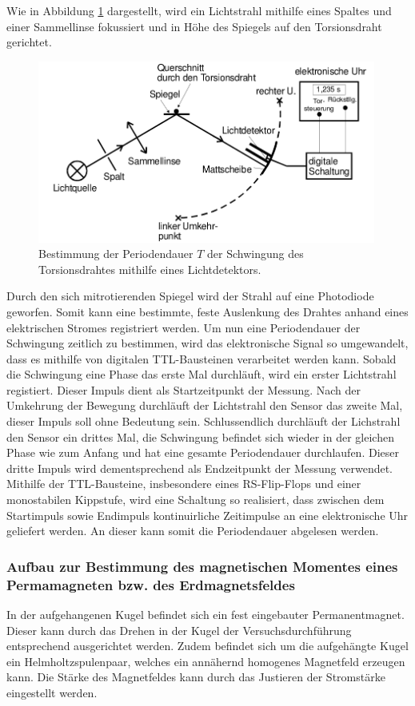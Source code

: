 Wie in Abbildung \ref{fig:d2} dargestellt, wird ein Lichtstrahl mithilfe eines Spaltes und einer Sammellinse fokussiert und in Höhe des Spiegels auf den Torsionsdraht gerichtet.
\begin{figure}[H]
  \centering
  \includegraphics[height=6cm]{aufbau2.png}
  \caption{Bestimmung der Periodendauer $T$ der Schwingung des Torsionsdrahtes mithilfe eines Lichtdetektors. \cite{sample}}
  \label{fig:d2}
\end{figure}
Durch den sich mitrotierenden Spiegel wird der Strahl auf eine Photodiode geworfen.
Somit kann eine bestimmte, feste Auslenkung des Drahtes anhand eines elektrischen Stromes registriert werden.
Um nun eine Periodendauer der Schwingung zeitlich zu bestimmen, wird das elektronische Signal so umgewandelt, dass es mithilfe von digitalen TTL-Bausteinen verarbeitet werden kann.
Sobald die Schwingung eine Phase das erste Mal durchläuft, wird ein erster Lichtstrahl registiert.
Dieser Impuls dient als Startzeitpunkt der Messung.
Nach der Umkehrung der Bewegung durchläuft der Lichtstrahl den Sensor das zweite Mal, dieser Impuls soll ohne Bedeutung sein.
Schlussendlich durchläuft der Lichstrahl den Sensor ein drittes Mal, die Schwingung befindet sich wieder in der gleichen Phase wie zum Anfang und hat eine gesamte Periodendauer durchlaufen.
Dieser dritte Impuls wird dementsprechend als Endzeitpunkt der Messung verwendet.
Mithilfe der TTL-Bausteine, insbesondere eines RS-Flip-Flops und einer monostabilen Kippstufe, wird eine Schaltung so realisiert, dass zwischen dem Startimpuls sowie Endimpuls kontinuirliche Zeitimpulse an eine elektronische Uhr geliefert werden.
An dieser kann somit die Periodendauer abgelesen werden.\\
\subsubsection{Aufbau zur Bestimmung des magnetischen Momentes eines Permamagneten bzw. des Erdmagnetsfeldes}
In der aufgehangenen Kugel befindet sich ein fest eingebauter Permanentmagnet.
Dieser kann durch das Drehen in der Kugel der Versuchsdurchführung entsprechend ausgerichtet werden.
Zudem befindet sich um die aufgehängte Kugel ein Helmholtzspulenpaar, welches ein annähernd homogenes Magnetfeld erzeugen kann.
Die Stärke des Magnetfeldes kann durch das Justieren der Stromstärke eingestellt werden.

